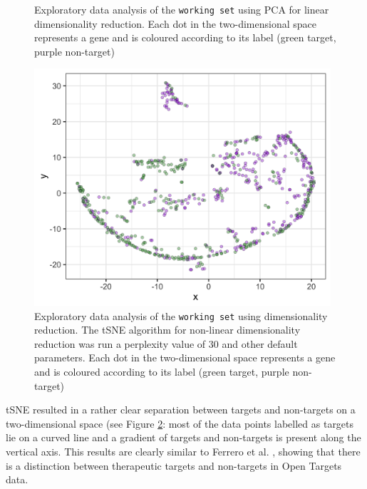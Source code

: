 \begin{figure}[H]
    \caption{Exploratory data analysis of the \texttt{working set} using PCA for linear dimensionality reduction. Each dot in the two-dimensional space represents a gene and is coloured according to its label (green target, purple non-target)}
    \label{fig:OT_PCA}
\end{figure}

\begin{figure}[H]
\centering
    \includegraphics[width=11cm]{pics/tSNE.png}
    \caption{Exploratory data analysis of the \texttt{working set} using dimensionality reduction. The tSNE algorithm for non-linear dimensionality reduction was run a perplexity value of 30 and other default parameters. Each dot in the two-dimensional space represents a gene and is coloured according to its label (green target, purple non-target)}
    \label{fig:OT_tSNE}
\end{figure}

tSNE resulted in a rather clear separation between targets and non-targets on a two-dimensional space (see Figure \ref{fig:OT_tSNE}: most of the data points labelled as targets lie on a curved line and a gradient of targets and non-targets is present along the vertical axis. This results are clearly similar to Ferrero et al. \cite{ferrero2017}, showing that there is a distinction between therapeutic targets and non-targets in Open Targets data.

